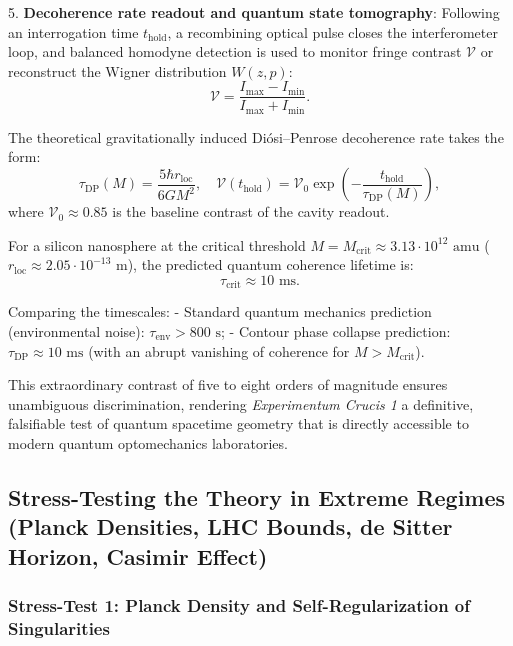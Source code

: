 5. \textbf{Decoherence rate readout and quantum state tomography}: Following an interrogation time $t_{\text{hold}}$, a recombining optical pulse closes the interferometer loop, and balanced homodyne detection is used to monitor fringe contrast $\mathcal{V}$ or reconstruct the Wigner distribution $W(z, p)$:
\begin{equation}\label{eq:5.49}\tag{5.49}
\mathcal{V} = \frac{I_{\text{max}} - I_{\text{min}}}{I_{\text{max}} + I_{\text{min}}}.
\end{equation}

The theoretical gravitationally induced Diósi--Penrose decoherence rate takes the form:
\begin{equation}\label{eq:5.50}\tag{5.50}
\tau_{\text{DP}}(M) = \frac{5 \hbar r_{\text{loc}}}{6 G M^2}, \quad \mathcal{V}(t_{\text{hold}}) = \mathcal{V}_0 \exp\left( - \frac{t_{\text{hold}}}{\tau_{\text{DP}}(M)} \right),
\end{equation}
where $\mathcal{V}_0 \approx 0.85$ is the baseline contrast of the cavity readout.

For a silicon nanosphere at the critical threshold $M = M_{\text{crit}} \approx 3.13 \cdot 10^{12}\text{ amu}$ ($r_{\text{loc}} \approx 2.05 \cdot 10^{-13}\text{ m}$), the predicted quantum coherence lifetime is:
\begin{equation}\label{eq:5.50b}\tag{5.50b}
\tau_{\text{crit}} \approx 10\text{ ms}.
\end{equation}

Comparing the timescales:
- Standard quantum mechanics prediction (environmental noise): $\tau_{\text{env}} > 800\text{ s}$;
- Contour phase collapse prediction: $\tau_{\text{DP}} \approx 10\text{ ms}$ (with an abrupt vanishing of coherence for $M > M_{\text{crit}}$).

This extraordinary contrast of five to eight orders of magnitude ensures unambiguous discrimination, rendering \textit{Experimentum Crucis 1} a definitive, falsifiable test of quantum spacetime geometry that is directly accessible to modern quantum optomechanics laboratories.

\subsection{Stress-Testing the Theory in Extreme Regimes (Planck Densities, LHC Bounds, de Sitter Horizon, Casimir Effect)}\label{sec:5.4}

\subsubsection{Stress-Test 1: Planck Density and Self-Regularization of Singularities}\label{sec:5.4.1}

